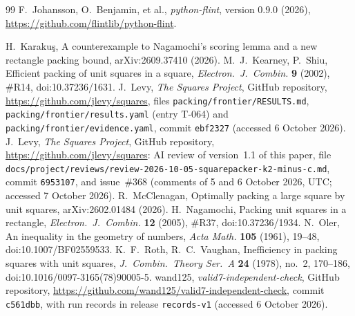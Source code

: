 \documentclass[11pt]{amsart}
\theoremstyle{definition}
\theoremstyle{remark}
\begin{document}
\begin{thebibliography}{99}
 F.~Johansson, O.~Benjamin, et al., \emph{python-flint}, version 0.9.0 (2026), \url{https://github.com/flintlib/python-flint}.

 H.~Karaku\c{s}, A counterexample to Nagamochi's scoring lemma and a new rectangle packing bound,
arXiv:2609.37410 (2026).
 M.~J.~Kearney, P.~Shiu, Efficient packing of unit squares in a square, \emph{Electron.\ J.\ Combin.} \textbf{9}
(2002), \#R14, doi:10.37236/1631.
 J.~Levy, \emph{The Squares Project}, GitHub repository, \url{https://github.com/jlevy/squares}, files
\texttt{packing/frontier/RESULTS.md}, \texttt{packing/frontier/results.yaml} (entry T-064) and \texttt{packing/frontier/evidence.yaml},
commit \texttt{ebf2327} (accessed 6 October 2026).
 J.~Levy, \emph{The Squares Project}, GitHub repository, \url{https://github.com/jlevy/squares}: AI review of version~1.1 of
this paper, file \texttt{docs/project/reviews/review-2026-10-05-squarepacker-k2-minus-c.md}, commit \texttt{6953107}, and issue~\#368
(comments of 5 and 6 October 2026, UTC; accessed 7 October 2026).
 R.~McClenagan, Optimally packing a large square by unit squares, arXiv:2602.01484 (2026).
 H.~Nagamochi, Packing unit squares in a rectangle, \emph{Electron.\ J.\ Combin.} \textbf{12} (2005), \#R37, doi:10.37236/1934.
 N.~Oler, An inequality in the geometry of numbers, \emph{Acta Math.} \textbf{105} (1961), 19--48,
doi:10.1007/BF02559533.
 K.~F.~Roth, R.~C.~Vaughan, Inefficiency in packing squares with unit squares, \emph{J.\ Combin.\ Theory Ser.\ A}
\textbf{24} (1978), no.~2, 170--186, doi:10.1016/0097-3165(78)90005-5.
 wand125, \emph{valid7-independent-check}, GitHub repository,
\url{https://github.com/wand125/valid7-independent-check}, commit \texttt{c561dbb}, with run records in release \texttt{records-v1}
(accessed 6 October 2026).
\end{thebibliography}
\end{document}

